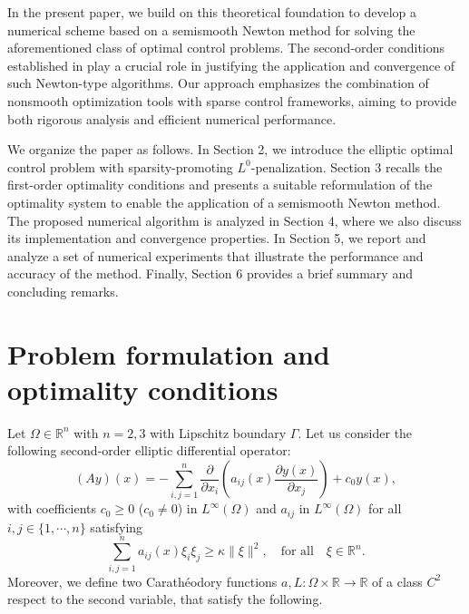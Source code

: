 \documentclass[11pt,a4paper]{amsart}
\renewcommand{\l}{\left}
\renewcommand{\r}{\right}
\newcommand{\om}{\Omega}
\newcommand{\reals}{\mathbb{R}}
\newcommand{\norm}[1]{\lVert #1 \rVert}
\begin{document}
In the present paper, we build on this theoretical foundation to develop a numerical scheme based on a semismooth Newton method for solving the aforementioned class of optimal control problems. The second-order conditions established in \cite{casaswachsmuth} play a crucial role in justifying the application and convergence of such Newton-type algorithms. Our approach emphasizes the combination of nonsmooth optimization tools with sparse control frameworks, aiming to provide both rigorous analysis and efficient numerical performance.

We organize the paper as follows. In Section 2, we introduce the elliptic optimal control problem with sparsity-promoting $L^0$-penalization. Section 3 recalls the first-order optimality conditions and presents a suitable reformulation of the optimality system to enable the application of a semismooth Newton method. The proposed numerical algorithm is analyzed in Section 4, where we also discuss its implementation and convergence properties. In Section 5, we report and analyze a set of numerical experiments that illustrate the performance and accuracy of the method. Finally, Section 6 provides a brief summary and concluding remarks.
\section{Problem formulation and optimality conditions}

Let $\om \in \reals^{n}$ with $n=2, 3$ with Lipschitz boundary $\Gamma$. Let us consider the following second-order elliptic differential operator:
\[
    (Ay)(x) = - \sum_{i,j=1}^n \frac{\partial}{\partial x_i}	\l( a_{ij}(x)\frac{\partial y(x)} {\partial x_j }\r) +c_0 y(x),
\]
with coefficients  $c_0 \geq 0$  ($c_0 \not =0$) in  $L^\infty(\om)$ and  $a_{ij}$  in $L^\infty(\om)$ for all $i,j\in \{1,\cdots,n\}$ satisfying
\begin{equation}\label{pdecondition}
    \sum_{i,j=1}^{n}a_{ij}(x)\xi_{i}\xi_{j} \ge \kappa\norm{\xi}^2, \quad \text{for all} \quad \xi\in \reals^n.
\end{equation}
Moreover, we define two Carathéodory functions $a, L:\om\times\reals\to \reals$ of a class $C^2$ respect to the second variable, that satisfy the following.
\end{document}
